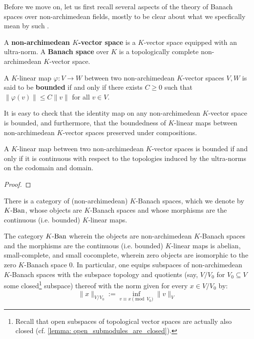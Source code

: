             Before we move on, let us first recall several aspects of the theory of Banach spaces over non-archimedean fields, mostly to be clear about what we specfically mean by such .
            \begin{definition} \label{def: non_archimedean_banach_spaces}
                A \textbf{non-archimedean $K$-vector space} is a $K$-vector space equipped with an ultra-norm. A \textbf{Banach space} over $K$ is a topologically complete non-archimedean $K$-vector space.
            \end{definition}
            \begin{definition} \label{def: bounded_linear_maps_between_non_archimedean_vector_spaces}
                A $K$-linear map $\varphi: V \to W$ between two non-archimedean $K$-vector spaces $V, W$ is said to be \textbf{bounded} if and only if there exists $C \geq 0$ such that $\|\varphi(v)\| \leq C \|v\|$ for all $v \in V$.
            \end{definition}
            \begin{remark}
                It is easy to check that the identity map on any non-archimedean $K$-vector space is bounded, and furthermore, that the boundedness of $K$-linear maps between non-archimedean $K$-vector spaces preserved under compositions.
            \end{remark}
            \begin{proposition}
                A $K$-linear map between two non-archimedean $K$-vector spaces is bounded if and only if it is continuous with respect to the topologies induced by the ultra-norms on the codomain and domain.
            \end{proposition}
                \begin{proof}
                    
                \end{proof}
            \begin{corollary}
                There is a category of (non-archimedean) $K$-Banach spaces, which we denote by $K\text{-}\mathrm{Ban}$, whose objects are $K$-Banach spaces and whose morphisms are the continuous (i.e. bounded) $K$-linear maps.
            \end{corollary}
            \begin{lemma} \label{lemma: (co)kernels_of_non_archimedean_banach_spaces}
                The category $K\text{-}\mathrm{Ban}$ wherein the objects are non-archimedean $K$-Banach spaces and the morphisms are the continuous (i.e. bounded) $K$-linear maps is abelian, small-complete, and small cocomplete, wherein zero objects are isomorphic to the zero $K$-Banach space $0$. In particular, one equips subspaces of non-archimedean $K$-Banach spaces with the subspace topology and quotients (say, $V/V_0$ for $V_0 \subseteq V$ some closed\footnote{Recall that open subspaces of topological vector spaces are actually also closed (cf. \ref{lemma: open_submodules_are_closed}).} subspace) thereof with the norm given for every $x \in V/V_0$ by:
                    $$\|x\|_{V/V_0} := \inf_{v \equiv x \pmod{V_0}} \|v\|_V$$
            \end{lemma}
